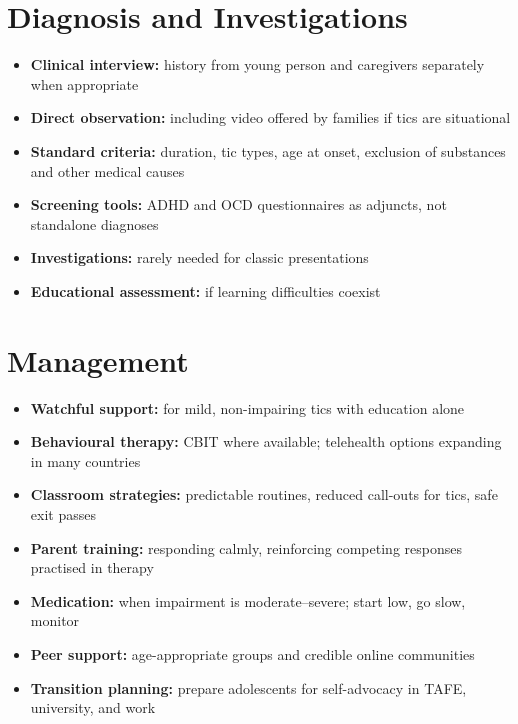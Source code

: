 \section*{Diagnosis and Investigations}
\begin{itemize}
    \item \textbf{Clinical interview:} history from young person and caregivers separately when appropriate
    \item \textbf{Direct observation:} including video offered by families if tics are situational
    \item \textbf{Standard criteria:} duration, tic types, age at onset, exclusion of substances and other medical causes
    \item \textbf{Screening tools:} ADHD and OCD questionnaires as adjuncts, not standalone diagnoses
    \item \textbf{Investigations:} rarely needed for classic presentations
    \item \textbf{Educational assessment:} if learning difficulties coexist
\end{itemize}

\section*{Management}
\begin{itemize}
    \item \textbf{Watchful support:} for mild, non-impairing tics with education alone
    \item \textbf{Behavioural therapy:} CBIT where available; telehealth options expanding in many countries
    \item \textbf{Classroom strategies:} predictable routines, reduced call-outs for tics, safe exit passes
    \item \textbf{Parent training:} responding calmly, reinforcing competing responses practised in therapy
    \item \textbf{Medication:} when impairment is moderate--severe; start low, go slow, monitor
    \item \textbf{Peer support:} age-appropriate groups and credible online communities
    \item \textbf{Transition planning:} prepare adolescents for self-advocacy in TAFE, university, and work
\end{itemize}

